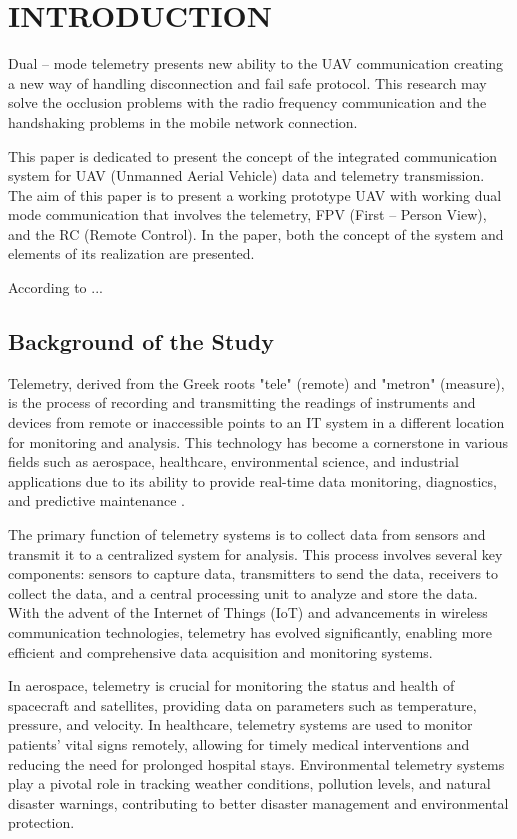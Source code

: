 \chapter{INTRODUCTION}

{\baselineskip
Dual – mode telemetry presents new ability to the UAV communication creating a new way of handling disconnection and fail safe protocol. This research may solve the occlusion problems with the radio frequency communication and the handshaking problems in the mobile network connection. 

This paper is dedicated to present the concept of the integrated communication system for UAV (Unmanned Aerial Vehicle) data and telemetry transmission. The aim of this paper is to present a working prototype UAV with working dual mode communication that involves the telemetry, FPV (First – Person View), and the RC (Remote Control). In the paper, both the concept of the system and elements of its realization are presented.  \citep{Bhattacharya2004}

According to \citep{Fuller2014} ... 


\section{Background of the Study}

Telemetry, derived from the Greek roots "tele" (remote) and "metron" (measure), is the process of recording and transmitting the readings of instruments and devices from remote or inaccessible points to an IT system in a different location for monitoring and analysis. This technology has become a cornerstone in various fields such as aerospace, healthcare, environmental science, and industrial applications due to its ability to provide real-time data monitoring, diagnostics, and predictive maintenance \citep{Butcher2014}.

The primary function of telemetry systems is to collect data from sensors and transmit it to a centralized system for analysis. This process involves several key components: sensors to capture data, transmitters to send the data, receivers to collect the data, and a central processing unit to analyze and store the data. With the advent of the Internet of Things (IoT) and advancements in wireless communication technologies, telemetry has evolved significantly, enabling more efficient and comprehensive data acquisition and monitoring systems. 

In aerospace, telemetry is crucial for monitoring the status and health of spacecraft and satellites, providing data on parameters such as temperature, pressure, and velocity. In healthcare, telemetry systems are used to monitor patients' vital signs remotely, allowing for timely medical interventions and reducing the need for prolonged hospital stays. Environmental telemetry systems play a pivotal role in tracking weather conditions, pollution levels, and natural disaster warnings, contributing to better disaster management and environmental protection.

}
